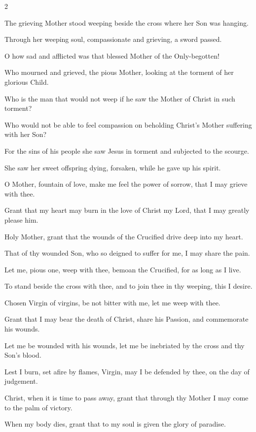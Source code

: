 \begin{multicols}{2}
\raggedcolumns
\begin{enpars}
The grieving Mother stood weeping beside the cross where her Son was hanging.

Through her weeping soul, compassionate and grieving, a sword passed.

O how sad and afflicted was that blessed Mother of the Only-begotten!

Who mourned and grieved, the pious Mother, looking at the torment of her glorious Child.

Who is the man that would not weep if he saw the Mother of Christ in such torment?

Who would not be able to feel compassion on beholding Christ’s Mother suffering with her Son?

For the sins of his people she saw Jesus in torment and subjected to the scourge.

She saw her sweet offspring dying, forsaken, while he gave up his spirit.

O Mother, fountain of love, make me feel the power of sorrow, that I may grieve with thee.

Grant that my heart may burn in the love of Christ my Lord, that I may greatly please him.

Holy Mother, grant that the wounds of the Crucified drive deep into my heart.

That of thy wounded Son, who so deigned to suffer for me, I may share the pain.

Let me, pious one, weep with thee, bemoan the Crucified, for as long as I live.

To stand beside the cross with thee, and to join thee in thy weeping, this I desire.

Chosen Virgin of virgins, be not bitter with me, let me weep with thee.

Grant that I may bear the death of Christ, share his Passion, and commemorate his wounds.

Let me be wounded with his wounds, let me be inebriated by the cross and thy Son’s blood.

Lest I burn, set afire by flames, Virgin, may I be defended by thee, on the day of judgement.

Christ, when it is time to pass away, grant that through thy Mother I may come to the palm of victory.

When my body dies, grant that to my soul is given the glory of paradise.
\end{enpars}\end{multicols}